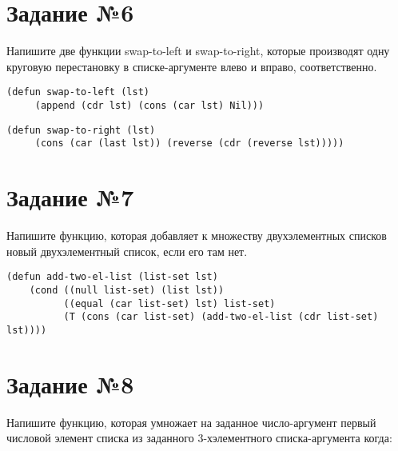 \section{Задание №6}

Напишите две функции swap-to-left и swap-to-right, которые производят одну
круговую перестановку в списке-аргументе влево и вправо, соответственно.

\vspace{4mm}
\begin{minipage}{0.92\linewidth}
\begin{lstlisting}
(defun swap-to-left (lst)
     (append (cdr lst) (cons (car lst) Nil)))
\end{lstlisting}
\end{minipage}

\vspace{4mm}
\begin{minipage}{0.92\linewidth}
\begin{lstlisting}
(defun swap-to-right (lst)
     (cons (car (last lst)) (reverse (cdr (reverse lst)))))
\end{lstlisting}
\end{minipage}

\section{Задание №7}

Напишите функцию, которая добавляет к множеству двухэлементных списков
новый двухэлементный список, если его там нет.

\vspace{4mm}
\begin{minipage}{0.92\linewidth}
\begin{lstlisting}
(defun add-two-el-list (list-set lst)
    (cond ((null list-set) (list lst))
          ((equal (car list-set) lst) list-set)
          (T (cons (car list-set) (add-two-el-list (cdr list-set) lst))))
\end{lstlisting}
\end{minipage}

\section{Задание №8}

Напишите функцию, которая умножает на заданное число-аргумент первый
числовой элемент списка из заданного 3-хэлементного списка-аргумента
когда:

